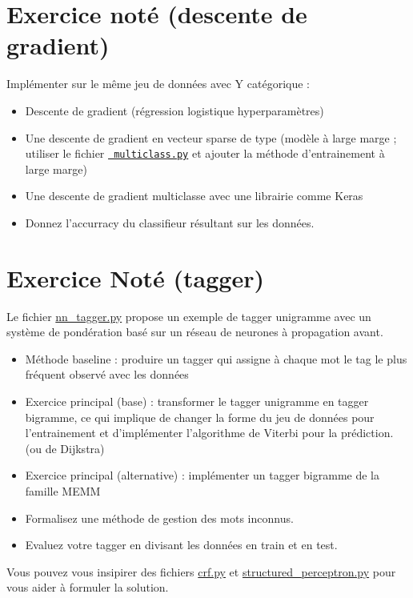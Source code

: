 \documentclass[11pt,openany]{book}
\newcommand{\ac}[1]{{\sc #1}} %
\begin{document}
\appendix

\chapter{Exercice noté (descente de gradient)}

Implémenter sur le même jeu de données avec Y catégorique : 

\begin{itemize}
\item Descente de gradient (régression logistique hyperparamètres)
\item Une descente de gradient en vecteur sparse de type (modèle à large marge ; 
utiliser le fichier
\href{https://github.com/bencrabbe/parsing-at-diderot/blob/master/Multiclass.py}{\tt
  multiclass.py} et ajouter la méthode d'entrainement à large marge)
\item Une descente de gradient multiclasse avec une librairie comme Keras
\item Donnez l'accurracy du classifieur résultant sur les données.
\end{itemize}

\chapter{Exercice Noté (tagger)}

Le fichier \url{nn_tagger.py} propose un exemple de tagger unigramme avec un système de pondération basé sur 
un réseau de neurones à propagation avant.

\begin{itemize}
\item Méthode baseline : produire un tagger qui assigne à chaque mot le tag le plus fréquent observé avec les données
\item Exercice principal (base) : transformer le tagger unigramme en tagger bigramme, ce qui implique de changer la forme du jeu de données 
pour l'entrainement et d'implémenter l'algorithme de Viterbi pour la prédiction.  (ou de Dijkstra)
\item Exercice principal (alternative) : implémenter un tagger bigramme de la famille \ac{MEMM}
\item Formalisez une méthode de gestion des mots inconnus.  
\item Evaluez votre tagger en divisant les données en train et en test.
\end{itemize}
Vous pouvez vous insipirer des fichiers \url{crf.py} et \url{structured_perceptron.py} pour vous aider à formuler la solution.
\end{document}
